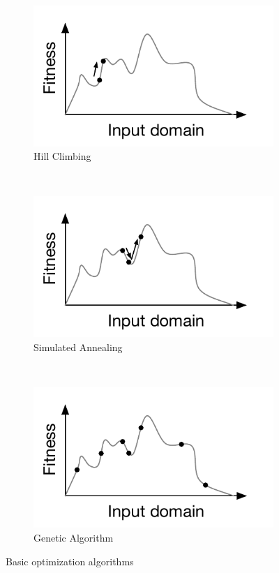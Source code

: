 \documentclass[11pt]{sdm}
\begin{document}
\begin{figure}
  \centering
  \begin{subfigure}[b]{0.3\textwidth}
    \includegraphics[width=\textwidth]{hillclimbing}
\caption{Hill Climbing}
\label{fig:hill_climbing}
  \end{subfigure}
  ~
  \begin{subfigure}[b]{0.3\textwidth}
    \includegraphics[width=\textwidth]{simulated_annealing}
\caption{Simulated Annealing}
\label{fig:simulated_annealing}
  \end{subfigure}
  ~
  \begin{subfigure}[b]{0.3\textwidth}
    \includegraphics[width=\textwidth]{genetic_algo}
\caption{Genetic Algorithm}
\label{fig:genetic_algo}
  \end{subfigure}
\caption{Basic optimization algorithms}
\label{fig:optimization_algos}
\end{figure}
\end{document}
